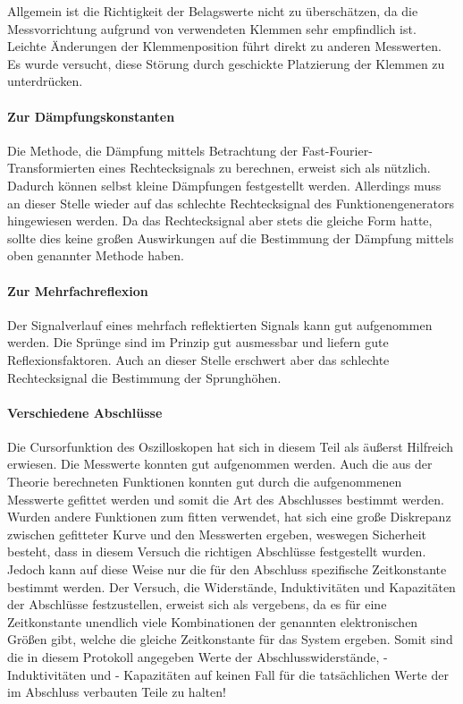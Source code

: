 Allgemein ist die Richtigkeit der Belagswerte nicht zu überschätzen, da
die Messvorrichtung aufgrund von verwendeten Klemmen sehr empfindlich
ist. Leichte Änderungen der Klemmenposition führt direkt zu anderen
Messwerten. Es wurde versucht, diese Störung durch geschickte
Platzierung der Klemmen zu unterdrücken.

\paragraph{Zur Dämpfungskonstanten}
Die Methode, die Dämpfung mittels Betrachtung der
Fast-Fourier-Transformierten eines Rechtecksignals zu berechnen, erweist
sich als nützlich. Dadurch können selbst kleine Dämpfungen festgestellt
werden.  Allerdings muss an dieser Stelle wieder auf das schlechte
Rechtecksignal des Funktionengenerators hingewiesen werden.  Da das
Rechtecksignal aber stets die gleiche Form hatte, sollte dies keine
großen Auswirkungen auf die Bestimmung der Dämpfung mittels oben
genannter Methode haben.

\paragraph{Zur Mehrfachreflexion}
Der Signalverlauf eines mehrfach reflektierten Signals kann gut
aufgenommen werden. Die Sprünge sind im Prinzip gut ausmessbar und
liefern gute Reflexionsfaktoren.  Auch an dieser Stelle erschwert aber
das schlechte Rechtecksignal die Bestimmung der Sprunghöhen.

\paragraph{Verschiedene Abschlüsse}
Die Cursorfunktion des Oszilloskopen hat sich in diesem Teil als äußerst
Hilfreich erwiesen. Die Messwerte konnten gut aufgenommen werden. Auch
die aus der Theorie berechneten Funktionen konnten gut durch die
aufgenommenen Messwerte gefittet werden und somit die Art des
Abschlusses bestimmt werden.  Wurden andere Funktionen zum fitten
verwendet, hat sich eine große Diskrepanz zwischen gefitteter Kurve und
den Messwerten ergeben, weswegen Sicherheit besteht, dass in diesem
Versuch die richtigen Abschlüsse festgestellt wurden.\\
Jedoch kann auf diese Weise nur die für den Abschluss spezifische 
Zeitkonstante bestimmt werden. Der Versuch, die Widerstände, 
Induktivitäten und Kapazitäten der Abschlüsse festzustellen, 
erweist sich als vergebens, da es für eine Zeitkonstante unendlich 
viele Kombinationen der genannten elektronischen Größen gibt, 
welche die gleiche Zeitkonstante für das System ergeben. Somit 
sind die in diesem Protokoll angegeben Werte der Abschlusswiderstände,
 -Induktivitäten und - Kapazitäten auf keinen Fall für die 
tatsächlichen Werte der im Abschluss verbauten Teile zu halten!
